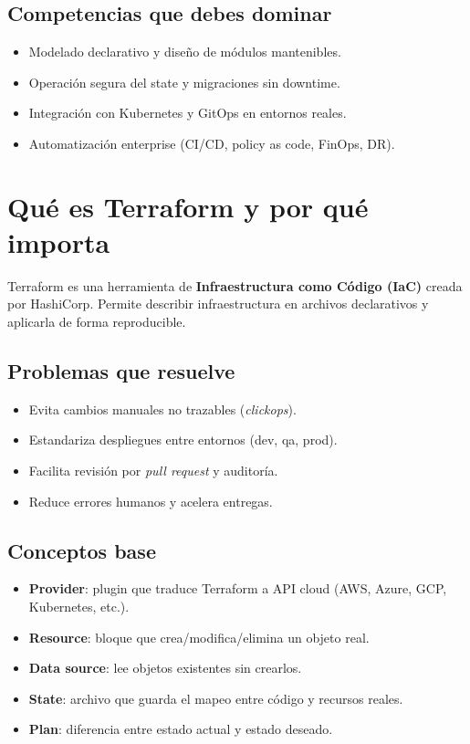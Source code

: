 \documentclass[12pt,a4paper]{article}
\begin{document}
\subsection{Competencias que debes dominar}
\begin{itemize}
	\item Modelado declarativo y diseño de módulos mantenibles.
	\item Operación segura del state y migraciones sin downtime.
	\item Integración con Kubernetes y GitOps en entornos reales.
	\item Automatización enterprise (CI/CD, policy as code, FinOps, DR).
\end{itemize}

\section{Qué es Terraform y por qué importa}

Terraform es una herramienta de \textbf{Infraestructura como Código (IaC)} creada por HashiCorp.
Permite describir infraestructura en archivos declarativos y aplicarla de forma reproducible.

\subsection{Problemas que resuelve}
\begin{itemize}
		\item Evita cambios manuales no trazables (\textit{clickops}).
		\item Estandariza despliegues entre entornos (dev, qa, prod).
		\item Facilita revisión por \textit{pull request} y auditoría.
		\item Reduce errores humanos y acelera entregas.
\end{itemize}

\subsection{Conceptos base}
\begin{itemize}
		\item \textbf{Provider}: plugin que traduce Terraform a API cloud (AWS, Azure, GCP, Kubernetes, etc.).
		\item \textbf{Resource}: bloque que crea/modifica/elimina un objeto real.
		\item \textbf{Data source}: lee objetos existentes sin crearlos.
		\item \textbf{State}: archivo que guarda el mapeo entre código y recursos reales.
		\item \textbf{Plan}: diferencia entre estado actual y estado deseado.
\end{itemize}
\end{document}
